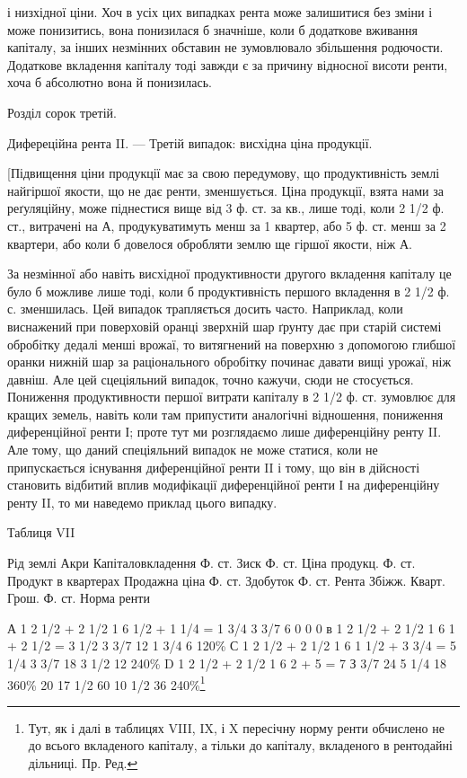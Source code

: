 і низхідної ціни. Хоч в усіх цих випадках рента може залишитися без зміни
і може понизитись, вона понизилася б значніше, коли б додаткове вживання
капіталу, за інших незмінних обставин не зумовлювало збільшення родючости. Додаткове вкладення
капіталу тоді завжди є за причину відносної висоти ренти,
хоча б абсолютно вона й понизилась.

Розділ сорок третій.

Дифереційна рента II. — Третій випадок:
висхідна ціна продукції.

[Підвищення ціни продукції має за свою передумову, що продуктивність землі
найгіршої якости, що не дає ренти, зменшується. Ціна продукції, взята нами за
реґуляційну, може піднестися вище від 3 ф. ст. за кв., лише тоді, коли 2 1/2 ф. ст.,
витрачені на А, продукуватимуть менш за 1 квартер, або 5 ф. ст. менш за
2 квартери, або коли б довелося обробляти землю ще гіршої якости, ніж А.

За незмінної або навіть висхідної продуктивности другого вкладення капіталу
це було б можливе лише тоді, коли б продуктивність першого вкладення в 2 1/2 ф. с.
зменшилась. Цей випадок трапляється досить часто. Наприклад, коли виснажений
при поверховій оранці зверхній шар ґрунту дає при старій системі обробітку
дедалі менші врожаї, то витягнений на поверхню з допомогою глибшої
оранки нижній шар за раціонального обробітку починає давати вищі
урожаї, ніж давніш. Але цей сцеціяльний випадок, точно кажучи, сюди не
стосується. Пониження продуктивности першої витрати капіталу в 2 1/2 ф. ст. зумовлює для кращих
земель, навіть коли там припустити аналогічні відношення,
пониження диференційної ренти І; проте тут ми розглядаємо лише диференційну
ренту II. Але тому, що даний спеціяльний випадок не може статися, коли не
припускається існування диференційної ренти II і тому, що він в дійсності
становить відбитий вплив модифікації диференційної ренти І на диференційну
ренту II, то ми наведемо приклад цього випадку.

Таблиця VII

Рід землі
Акри
Капіталовкладення Ф. ст.
Зиск Ф. ст.
Ціна продукц. Ф. ст.
Продукт в квартерах
Продажна ціна Ф. ст.
Здобуток Ф. ст.
Рента
Збіжж. Кварт.
Грош. Ф. ст.
Норма ренти

А    1    2  1/2 + 2 1/2     1    6      1/2 + 1 1/4 = 1 3/4     3 3/7      6                0      
        0           0
в    1    2  1/2 + 2 1/2     1     6      1 + 2 1/2 = 3 1/2        3 3/7     12               1 3/4 
     6        120\%
С    1    2  1/2 + 2 1/2    1     6      1 1/2 + 3 3/4 = 5 1/4  3 3/7     18               3 1/2    
 12        240\%
D    1    2  1/2 + 2 1/2    1    6       2 + 5 = 7                       З 3/7      24             5
1/4      18        360\%
                      20                                              17 1/2                        
60             10 1/2      36      240\%\footnote*{
Тут, як і далі в таблицях VIII, IX, і X пересічну норму ренти обчислено не до всього
вкладеного капіталу, а тільки до капіталу, вкладеного в рентодайні дільниці. Пр. Ред.
}

